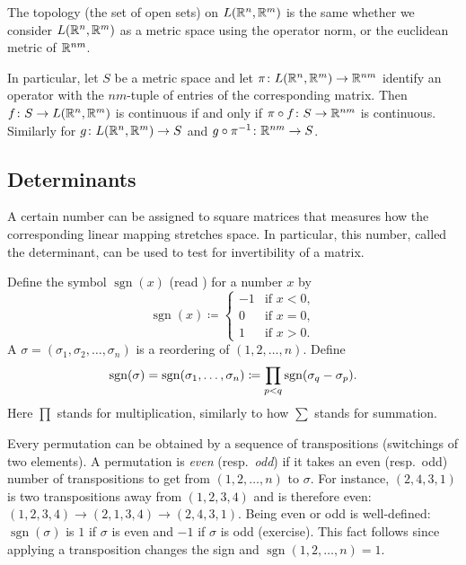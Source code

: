 \begin{prop} \label{prop:matrixcont}
The topology (the set of open sets) on $L({\mathbb{R}}^n,{\mathbb{R}}^m)$ is the same
whether we consider $L({\mathbb{R}}^n,{\mathbb{R}}^m)$ as a metric space using the operator
norm, or the euclidean metric of ${\mathbb{R}}^{nm}$.

In particular, let $S$ be a metric space and let
$\pi \colon L({\mathbb{R}}^n,{\mathbb{R}}^m) \to {\mathbb{R}}^{nm}$ identify
an operator with the $nm$-tuple of entries of the corresponding matrix.
Then
$f \colon S \to L({\mathbb{R}}^n,{\mathbb{R}}^m)$
is continuous
if and only if
$\pi \circ f \colon S \to {\mathbb{R}}^{nm}$ is
continuous.
Similarly for
$g \colon L({\mathbb{R}}^n,{\mathbb{R}}^m) \to S$ and
$g \circ \pi^{-1} \colon {\mathbb{R}}^{nm} \to S$.
\end{prop}

\subsection{Determinants}

A certain number can be assigned to square matrices that measures
how the corresponding linear mapping stretches space.  In particular,
this number, called the determinant, can be used to test for invertibility of a matrix.

Define the symbol
$\operatorname{sgn}(x)$ (read ) for a number $x$ by
\begin{equation*}
\operatorname{sgn}(x)
\coloneqq
\begin{cases}
-1 & \text{if } x < 0 , \\
0  & \text{if } x = 0 , \\
1  & \text{if } x > 0 .
\end{cases}
\end{equation*}
A \emph{}
$\sigma = (\sigma_1,\sigma_2,\ldots,\sigma_n)$ is
a reordering of $(1,2,\ldots,n)$. 
Define
\begin{equation} \label{eq:sgndef}
\operatorname{sgn}(\sigma) = \operatorname{sgn}(\sigma_1,\ldots,\sigma_n)
\coloneqq 
\prod_{p < q} \operatorname{sgn}(\sigma_q-\sigma_p) .
\avoidbreak
\end{equation}
Here $\prod$ stands for multiplication, similarly to how $\sum$ stands for
summation.

Every permutation can be obtained by
a sequence of transpositions (switchings of two elements).
A permutation is
\emph{even}
(resp.\ \emph{odd})
if it takes an even (resp.\ odd) number of
transpositions to get from $(1,2,\ldots,n)$ to $\sigma$.
For instance, $(2,4,3,1)$ is two transpositions away from 
$(1,2,3,4)$ and is therefore even: $(1,2,3,4) \to (2,1,3,4) \to (2,4,3,1)$.
Being even or odd is well-defined:
$\operatorname{sgn}(\sigma)$ 
is $1$ if $\sigma$ is even and $-1$ if $\sigma$ is odd (exercise).
This fact follows since applying
a transposition changes the sign and
$\operatorname{sgn}(1,2,\ldots,n) = 1$.

